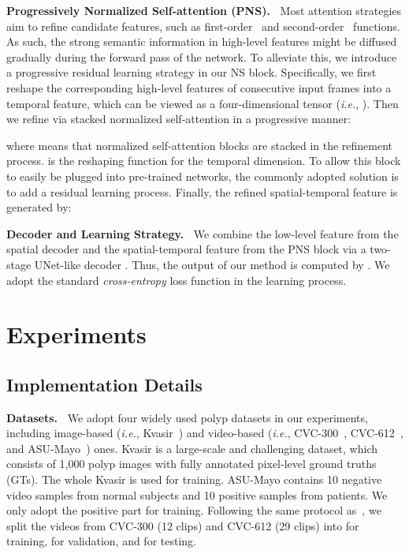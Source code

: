 \documentclass[runningheads]{llncs}
\def\ie{\emph{i.e.}}
\newcommand{\myPara}[1]{\noindent\textbf{#1~}}
\begin{document}
\myPara{Progressively Normalized Self-attention (PNS).}
Most attention strategies aim to refine candidate features, such as first-order~\cite{fan2020pra} and second-order~\cite{wang2018non,vaswani2017attention} functions.
As such, the strong semantic information in high-level features might be diffused gradually during the forward pass of the network.
To alleviate this, we introduce a progressive residual learning strategy in our NS block.
Specifically, we first reshape the corresponding high-level features  of consecutive input frames into a temporal feature, which can be viewed as a four-dimensional tensor (\ie, ).
Then we refine  via stacked normalized self-attention in a progressive manner:

where  means that  normalized self-attention blocks are stacked in the refinement process.
 is the reshaping function for the temporal dimension.
To allow this block to easily be plugged into pre-trained networks, the commonly adopted solution is to add a residual learning process.
Finally, the refined spatial-temporal feature is generated by:





\myPara{Decoder and Learning Strategy.}
We combine the low-level feature  from the spatial decoder and the spatial-temporal feature  from the PNS block via a two-stage UNet-like decoder . 
Thus, the output of our method is computed by .
We adopt the standard \textit{cross-entropy} loss function in the learning process. 

\section{Experiments}



\subsection{Implementation Details}

\myPara{Datasets.} 
We adopt four widely used polyp datasets in our experiments, including image-based (\ie, Kvasir~\cite{jha2020kvasir}) and video-based (\ie,  CVC-300~\cite{bernal2012towards}, CVC-612~\cite{bernal2015wm}, and ASU-Mayo~\cite{tajbakhsh2015automated}) ones.
Kvasir is a large-scale and challenging dataset, which consists of 1,000 polyp images with fully annotated pixel-level ground truths (GTs).
The whole Kvasir is used for training.
ASU-Mayo contains 10 negative video samples from normal subjects and 10 positive samples from patients.
We only adopt the positive part for training.
Following the same protocol as~\cite{bernal2012towards,bernal2015wm}, we split the videos from CVC-300 (12 clips) and CVC-612 (29 clips) into  for training,  for validation, and  for testing.
\end{document}
